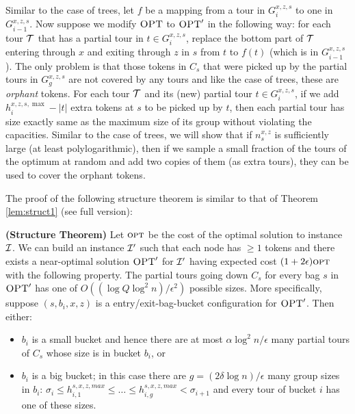 \documentclass[twoside,leqno]{article}
\newcommand{\calI}{{\cal I}}
\newcommand{\calT}{{\cal T}}
\newcommand{\opt}{\mbox{\sc opt}}
\newcommand{\OPT}{\mbox{\sc OPT}}
\newcommand{\eps}{\epsilon}
\begin{document}
Similar to the case of trees, let $f$ be a mapping from a tour in $G_i^{x,z,s}$ to one in $G_{i-1}^{x,z,s}$. Now suppose we modify $\OPT$ to $\OPT'$ in the following way: for each tour $\calT$ that has a partial tour in $t \in G_i^{x,z,s}$, replace the bottom part of $\calT$ entering through $x$ and exiting through $z$ in $s$ from $t$ to $f(t)$ (which is in $G_{i-1}^{x,z,s}$). The only problem is that those tokens in $C_s$ that were picked up by the partial tours in $G_g^{x,z,s}$ are not covered by any tours and like the case of trees, these are \emph{orphant} tokens. For each tour $\calT$ and its (new) partial tour $t \in G_i^{x,z,s}$, if we add $h_i^{{x,z,s}, \max} - |t|$ extra tokens at $s$ to be picked up by $t$, then each partial tour has size exactly same as the maximum size of its group without violating the capacities.
Similar to the case of trees, we will show that if $n_{s}^{x,z}$ is sufficiently large (at least polylogarithmic), then if we sample a small fraction of the tours of the optimum at random and add two copies of them (as extra tours), they can be used to cover the orphant tokens.

The proof of the following structure theorem is similar to that of Theorem \ref{lem:struct1} (see full version):


\begin{theorem}\label{lem:struct2} \textbf{(Structure Theorem)}
Let $\opt$ be the cost of the optimal solution to instance $\calI$. We can build an instance $\calI'$
such that each node has $\geq 1$ tokens and there exists a near-optimal solution $\OPT'$ for $\calI'$
having expected cost $(1 + 2\eps)\opt$ with the following property.
The partial tours going down $C_s$ for every bag $s$ in $\OPT'$ has one of $O((\log Q \log^2 n)/\eps^2)$ possible sizes.
More specifically, suppose $(s,b_i,x,z)$ is a entry/exit-bag-bucket configuration for $\OPT'$. Then either:
\begin{itemize}
\item $b_i$ is a small bucket and hence there are at most $\alpha \log^2 n/\eps$ many partial tours of $C_s$ whose size is in bucket $b_i$, or
\item $b_i$ is a big bucket; in this case there are $g = (2\delta \log n)/\eps $ many group sizes in $b_i$:
$\sigma_i \leq h_{i,1}^{s,x,z,max}\leq \ldots\leq h_{i,g}^{s,x,z,max}<\sigma_{i+1}$ and every tour of bucket $i$ has one of these sizes.
\end{itemize}
\end{theorem}
\end{document}
